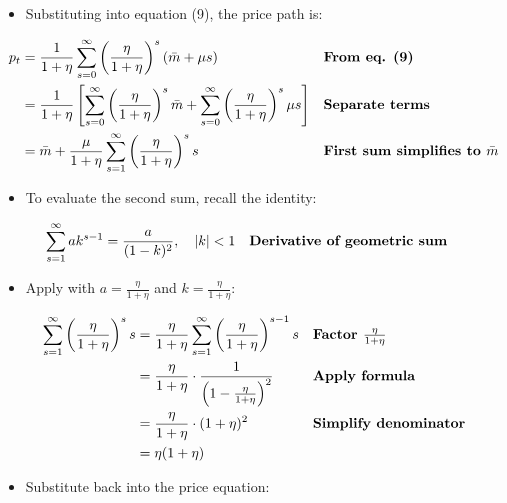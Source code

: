 \documentclass[12pt]{article}
\begin{document}
\begin{itemize}
    \item Substituting into equation (9), the price path is:
\end{itemize}

\singlespacing
\begin{align}
p_t &= \frac{1}{1+\eta} \sum_{s=0}^\infty \left(\frac{\eta}{1+\eta}\right)^s \left(\bar{m} + \mu s\right) && \text{\textbf{From eq. (9)}} \\
    &= \frac{1}{1+\eta} \left[ \sum_{s=0}^\infty \left(\frac{\eta}{1+\eta}\right)^s \bar{m} 
    + \sum_{s=0}^\infty \left(\frac{\eta}{1+\eta}\right)^s \mu s \right] && \text{\textbf{Separate terms}} \\
    &= \bar{m} + \frac{\mu}{1+\eta} \sum_{s=1}^\infty \left(\frac{\eta}{1+\eta}\right)^s s && \text{\textbf{First sum simplifies to $\bar m$}}
\end{align}

\begin{itemize}
    \item To evaluate the second sum, recall the identity:
\end{itemize}

\singlespacing
\begin{align}
\sum_{s=1}^\infty a k^{s-1} &= \frac{a}{(1-k)^2}, \quad |k|<1 && \text{\textbf{Derivative of geometric sum}}
\end{align}

\begin{itemize}
    \item Apply with $a=\tfrac{\eta}{1+\eta}$ and $k=\tfrac{\eta}{1+\eta}$:
\end{itemize}

\singlespacing
\begin{align}
\sum_{s=1}^\infty \left(\frac{\eta}{1+\eta}\right)^s s 
 &= \frac{\eta}{1+\eta} \sum_{s=1}^\infty \left(\frac{\eta}{1+\eta}\right)^{s-1} s && \text{\textbf{Factor $\tfrac{\eta}{1+\eta}$}} \\
 &= \frac{\eta}{1+\eta} \cdot \frac{1}{\left(1-\frac{\eta}{1+\eta}\right)^2} && \text{\textbf{Apply formula}} \\
 &= \frac{\eta}{1+\eta} \cdot (1+\eta)^2 && \text{\textbf{Simplify denominator}} \\
 &= \eta(1+\eta) 
\end{align}

\begin{itemize}
    \item Substitute back into the price equation:
\end{itemize}
\end{document}
